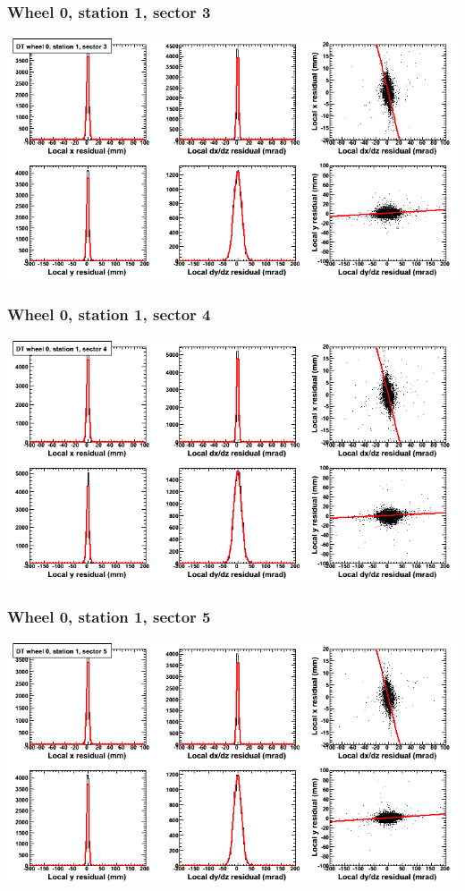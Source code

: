 \documentclass[compress]{beamer}
\begin{document}
\begin{frame}
\frametitle{Wheel 0, station 1, sector 3}
\includegraphics[width=\linewidth]{tmpbell_MBwhCst1sec03.png}
\end{frame}

\begin{frame}
\frametitle{Wheel 0, station 1, sector 4}
\includegraphics[width=\linewidth]{tmpbell_MBwhCst1sec04.png}
\end{frame}

\begin{frame}
\frametitle{Wheel 0, station 1, sector 5}
\includegraphics[width=\linewidth]{tmpbell_MBwhCst1sec05.png}
\end{frame}
\end{document}
